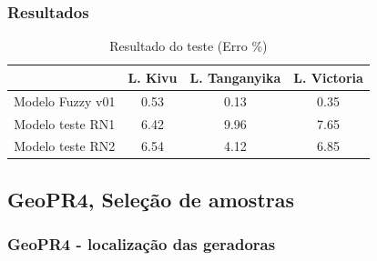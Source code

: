 \documentclass[aspectratio=169]{beamer} %
\begin{document}
{{
\begin{frame}
\frametitle{Resultados}
\begin{table}[htbp]
	\centering
	\caption{Resultado do teste (Erro \%)}
	\label{tab:variaveis}
	\begin{tabular}{c|c|c|c|}
	\hline
	& L. Kivu & L. Tanganyika & L. Victoria \\
	\hline
	Modelo Fuzzy v01& 0.53 & 0.13 & 0.35 \\
	Modelo teste RN1& 6.42 & 9.96 & 7.65 \\
	Modelo teste RN2& 6.54 & 4.12 & 6.85 \\
	\hline
	\end{tabular}
	\end{table}
	
\end{frame} 
}


\subsection{GeoPR4, Seleção de amostras}

{
\begin{frame}
	\frametitle{GeoPR4 - localização das geradoras}


\end{frame}}}
\end{document}
